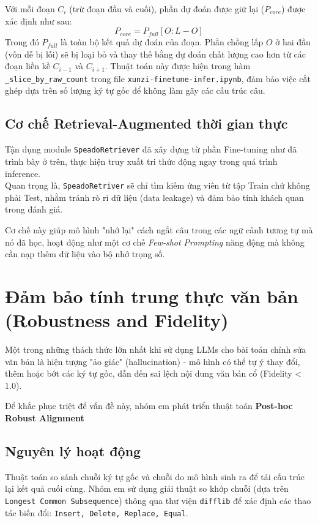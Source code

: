 Với mỗi đoạn $C_i$ (trừ đoạn đầu và cuối), phần dự đoán được giữ lại ($P_{core}$) được xác định như sau:
\begin{equation}
    P_{core} = P_{full}[O : L - O]
\end{equation}
Trong đó $P_{full}$ là toàn bộ kết quả dự đoán của đoạn. Phần chồng lấp $O$ ở hai đầu (vốn dễ bị lỗi) sẽ bị loại bỏ và thay thế bằng dự đoán chất lượng cao hơn từ các đoạn liền kề $C_{i-1}$ và $C_{i+1}$. Thuật toán này được hiện trong hàm \texttt{_slice_by_raw_count} trong file \texttt{xunzi-finetune-infer.ipynb}, đảm bảo việc cắt ghép dựa trên số lượng ký tự gốc để không làm gãy các cấu trúc câu.

\subsection{Cơ chế Retrieval-Augmented thời gian thực}

Tận dụng module \texttt{SpeadoRetriever} đã xây dựng từ phần Fine-tuning như đã trình bày ở trên, thực hiện truy xuất tri thức động ngay trong quá trình inference. 
\\
Quan trọng là, \texttt{SpeadoRetriver} sẽ chỉ tìm kiếm ứng viên từ tập Train chứ không phải Test, nhằm tránh rò rỉ dữ liệu (data leakage) và đảm bảo tính khách quan trong đánh giá.

Cơ chế này giúp mô hình "nhớ lại" cách ngắt câu trong các ngữ cảnh tương tự mà nó đã học, hoạt động như một cơ chế \textit{Few-shot Prompting} năng động mà không cần nạp thêm dữ liệu vào bộ nhớ trọng số.

\section{Đảm bảo tính trung thực văn bản (Robustness and Fidelity)}

Một trong những thách thức lớn nhất khi sử dụng LLMs cho bài toán chỉnh sửa văn bản là hiện tượng "ảo giác" (hallucination) - mô hình có thể tự ý thay đổi, thêm hoặc bớt các ký tự gốc, dẫn đến sai lệch nội dung văn bản cổ (Fidelity < 1.0).

Để khắc phục triệt để vấn đề này, nhóm em phát triển thuật toán \textbf{Post-hoc Robust Alignment} 

\subsection{Nguyên lý hoạt động}
Thuật toán so sánh chuỗi ký tự gốc và chuỗi do mô hình sinh ra để tái cấu trúc lại kết quả cuối cùng. Nhóm em sử dụng giải thuật so khớp chuỗi (dựa trên \texttt{Longest Common Subsequence}) thông qua thư viện \texttt{difflib} để xác định các thao tác biến đổi: \texttt{Insert, Delete, Replace, Equal}.

